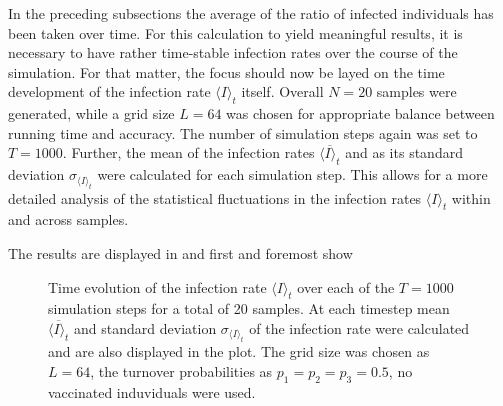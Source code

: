 In the preceding subsections the average of the ratio of infected individuals has been taken over time. For this calculation to yield meaningful results, it is necessary to have
rather time-stable infection rates over the course of the simulation. For that matter, the focus should now be layed on the time development of the infection rate $\langle I\rangle_t$ itself.
Overall $N=20$ samples were generated, while a grid size $L=64$ was chosen for appropriate balance between running time and accuracy. The number of simulation steps again was set to $T=1000$. 
Further, the mean of the infection rates $\overline{\langle I\rangle_t}$ and as its standard deviation $\sigma_{\langle I\rangle_t}$ were calculated for each simulation step. 
This allows for a more detailed analysis of the statistical fluctuations in the infection rates $\langle I\rangle_t$ within and across samples. 

The results are displayed in  and first and foremost show


\begin{figure}[ht]
    \centering
    \resizebox{\textwidth}{!}{}
    \caption{Time evolution of the infection rate $\langle I\rangle_t$ over each of the $T=1000$ simulation steps for a total of 20 samples. At each timestep mean $\overline{\langle I\rangle_t}$
    and standard deviation $\sigma_{\langle I\rangle_t}$ of the infection rate were calculated and are also displayed in the plot. The grid size was chosen as $L=64$, the turnover probabilities
    as $p_1=p_2=p_3=0.5$, no vaccinated induviduals were used.}\label{fig:res_dis_avg_inf_over_t}
\end{figure}
